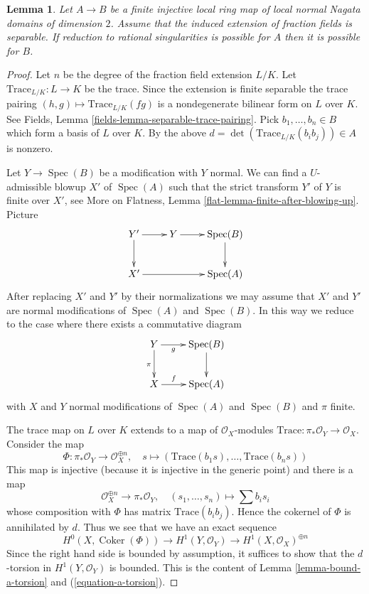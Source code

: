 \documentclass{stacks-project}
\theoremstyle{plain}
\newtheorem{lemma}[subsection]{Lemma}
\theoremstyle{definition}
\theoremstyle{remark}
\numberwithin{equation}{subsection}
\def\Spec{\mathop{\mathrm{Spec}}}
\def\Coker{\mathop{\mathrm{Coker}}}
\begin{document}
\begin{lemma}
\label{lemma-go-up-separable}
Let $A \to B$ be a finite injective local ring map of local normal
Nagata domains of dimension $2$. Assume that the induced extension of
fraction fields is separable. If reduction to rational singularities
is possible for $A$ then it is possible for $B$.
\end{lemma}

\begin{proof}
Let $n$ be the degree of the fraction field extension $L/K$.
Let $\text{Trace}_{L/K} : L \to K$ be the trace. Since the extension is finite
separable the trace pairing $(h, g) \mapsto \text{Trace}_{L/K}(fg)$
is a nondegenerate bilinear form on $L$ over $K$. See
Fields, Lemma \ref{fields-lemma-separable-trace-pairing}.
Pick $b_1, \ldots, b_n \in B$ which form a basis of $L$ over $K$.
By the above $d = \det(\text{Trace}_{L/K}(b_ib_j)) \in A$ is nonzero.

\medskip\noindent
Let $Y \to \Spec(B)$ be a modification with $Y$ normal. We can find
a $U$-admissible blowup $X'$ of $\Spec(A)$ such that the strict transform
$Y'$ of $Y$ is finite over $X'$, see More on Flatness, Lemma
\ref{flat-lemma-finite-after-blowing-up}. Picture
$$
\xymatrix{
Y' \ar[d] \ar[r] & Y \ar[r] & \Spec(B) \ar[d] \\
X' \ar[rr] & & \Spec(A)
}
$$
After replacing $X'$ and $Y'$ by their normalizations we may assume that
$X'$ and $Y'$ are normal modifications of $\Spec(A)$ and $\Spec(B)$.
In this way we reduce to the case where there exists a commutative diagram
$$
\xymatrix{
Y \ar[d]_\pi \ar[r]_-g & \Spec(B) \ar[d] \\
X \ar[r]^-f & \Spec(A)
}
$$
with $X$ and $Y$ normal modifications of $\Spec(A)$ and $\Spec(B)$ and
$\pi$ finite.

\medskip\noindent
The trace map on $L$ over $K$ extends to a map of $\mathcal{O}_X$-modules
$\text{Trace} : \pi_*\mathcal{O}_Y \to \mathcal{O}_X$. Consider the map
$$
\Phi : \pi_*\mathcal{O}_Y \longrightarrow \mathcal{O}_X^{\oplus n},\quad
s \longmapsto (\text{Trace}(b_1s), \ldots, \text{Trace}(b_ns))
$$
This map is injective (because it is injective in the generic point)
and there is a map
$$
\mathcal{O}_X^{\oplus n} \longrightarrow \pi_*\mathcal{O}_Y,\quad
(s_1, \ldots, s_n) \longmapsto \sum b_i s_i
$$
whose composition with $\Phi$ has matrix $\text{Trace}(b_ib_j)$.
Hence the cokernel of $\Phi$ is annihilated by $d$. Thus we see that
we have an exact sequence
$$
H^0(X, \Coker(\Phi)) \to H^1(Y, \mathcal{O}_Y) \to
H^1(X, \mathcal{O}_X)^{\oplus n}
$$
Since the right hand side is bounded by assumption, it suffices to show
that the $d$-torsion in $H^1(Y, \mathcal{O}_Y)$ is bounded.
This is the content of Lemma \ref{lemma-bound-a-torsion} and
(\ref{equation-a-torsion}).
\end{proof}
\end{document}

